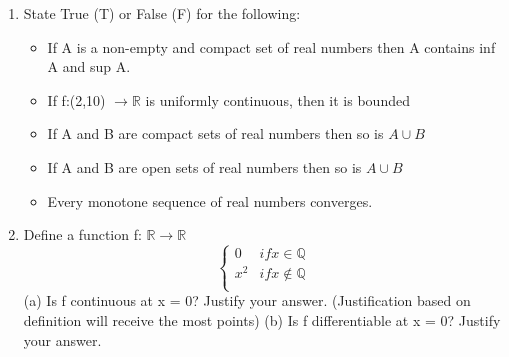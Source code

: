 \documentclass[12pt]{article}
\begin{document}
\begin{enumerate}
    \item State True (T) or False (F) for the following: 
\begin{itemize}
    \item If A is a non-empty and compact set of real numbers then A contains inf A and sup A. 
    \item If f:(2,10) $\to \mathbb{R}$ is uniformly continuous, then it is bounded 
    \item If A and B are compact sets of real numbers then so is $A \cup B$
    \item If A and B are open sets of real numbers then so is $A \cup B$
    \item Every monotone sequence of real numbers converges.
    \end{itemize}
       \item Define a function f: $\mathbb{R} \to \mathbb{R}$
\[ \begin{cases} 
      0 & if x \in \mathbb{Q} \\
      x^{2} & if x \not \in \mathbb{Q} \\
   \end{cases}
\]
(a) Is f continuous at x = 0? Justify your answer. (Justification based on definition will receive the most points) 
\newline
(b) Is f differentiable at x = 0? Justify your answer.

\end{enumerate}
\end{document}
